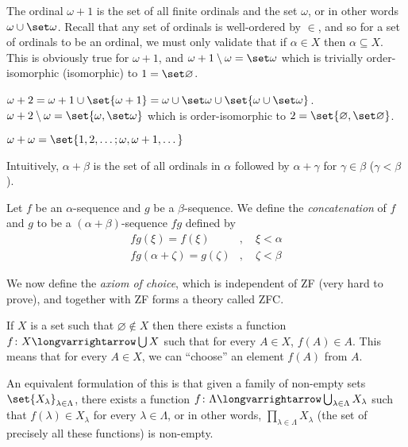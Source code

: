 \documentclass[10pt]{article}
\let\longto=\longvarrightarrow
\begin{document}
\begin{exam*}

    \benum
        \item The ordinal $\omega+1$ is the set of all finite ordinals and the set $\omega$, or in other words $\omega\cup\set\omega$.
        Recall that any set of ordinals is well-ordered by $\in$, and so for a set of ordinals to be an ordinal, we must only validate that if $\alpha\in X$ then $\alpha\subseteq X$.
        This is obviously true for $\omega+1$, and $\omega+1\setminus\omega=\set\omega$ which is trivially order-isomorphic (isomorphic) to $1=\set\varnothing$.

        \item $\omega+2=\omega+1\cup\set{\omega+1}=\omega\cup\set\omega\cup\set{\omega\cup\set\omega}$.
        $\omega+2\setminus\omega=\set{\omega,\set\omega}$ which is order-isomorphic to $2=\set{\varnothing,\set\varnothing}$.

        \item $\omega+\omega=\set{1,2,\dots; \omega,\omega+1,\dots}$
    \eenum

\end{exam*}

Intuitively, $\alpha+\beta$ is the set of all ordinals in $\alpha$ followed by $\alpha+\gamma$ for $\gamma\in\beta$ ($\gamma<\beta$).

Let $f$ be an $\alpha$-sequence and $g$ be a $\beta$-sequence.
We define the \emph{concatenation} of $f$ and $g$ to be a $(\alpha+\beta)$-sequence $fg$ defined by
\begin{align*}
    fg(\xi) = f(\xi) &, \quad\xi<\alpha \\ 
    fg(\alpha+\zeta) = g(\zeta) &, \quad\zeta<\beta
\end{align*}

We now define the \emph{axiom of choice}, which is independent of ZF (very hard to prove), and together with ZF forms a theory called ZFC.

\begin{axiom*}

    If $X$ is a set such that $\varnothing\notin X$ then there exists a function $f\colon X\longto\bigcup X$ such that for every $A\in X$, $f(A)\in A$.
    This means that for every $A\in X$, we can ``choose'' an element $f(A)$ from $A$.

\end{axiom*}

An equivalent formulation of this is that given a family of non-empty sets $\set{X_\lambda}_{\lambda\in\Lambda}$, there exists a function $f\colon\Lambda\longto\bigcup_{\lambda\in\Lambda}X_\lambda$ such
that $f(\lambda)\in X_\lambda$ for every $\lambda\in\Lambda$, or in other words, $\prod_{\lambda\in\Lambda} X_\lambda$ (the set of precisely all these functions) is non-empty.
\end{document}
